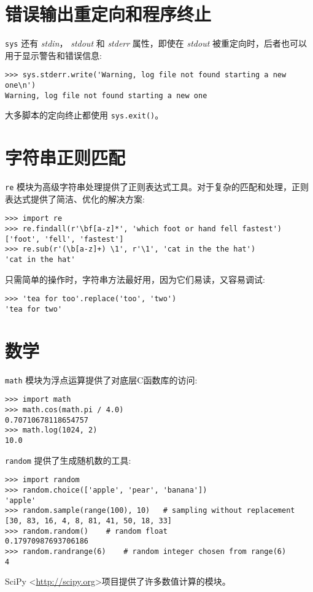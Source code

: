 \section{错误输出重定向和程序终止}
\texttt{sys} 还有 \textit{stdin}， \textit{stdout} 和 \textit{stderr} 属性，即使在 \textit{stdout} 被重定向时，后者也可以用于显示警告和错误信息:
\begin{lstlisting}
>>> sys.stderr.write('Warning, log file not found starting a new one\n')
Warning, log file not found starting a new one
\end{lstlisting}
大多脚本的定向终止都使用 \texttt{sys.exit()}。
\section{字符串正则匹配}
\texttt{re} 模块为高级字符串处理提供了正则表达式工具。对于复杂的匹配和处理，正则表达式提供了简洁、优化的解决方案:
\begin{lstlisting}
>>> import re
>>> re.findall(r'\bf[a-z]*', 'which foot or hand fell fastest')
['foot', 'fell', 'fastest']
>>> re.sub(r'(\b[a-z]+) \1', r'\1', 'cat in the the hat')
'cat in the hat'
\end{lstlisting}
只需简单的操作时，字符串方法最好用，因为它们易读，又容易调试:
\begin{lstlisting}
>>> 'tea for too'.replace('too', 'two')
'tea for two'
\end{lstlisting}
\section{数学}
\texttt{math} 模块为浮点运算提供了对底层C函数库的访问:
\begin{lstlisting}
>>> import math
>>> math.cos(math.pi / 4.0)
0.70710678118654757
>>> math.log(1024, 2)
10.0
\end{lstlisting}
\texttt{random} 提供了生成随机数的工具:
\begin{lstlisting}
>>> import random
>>> random.choice(['apple', 'pear', 'banana'])
'apple'
>>> random.sample(range(100), 10)   # sampling without replacement
[30, 83, 16, 4, 8, 81, 41, 50, 18, 33]
>>> random.random()    # random float
0.17970987693706186
>>> random.randrange(6)    # random integer chosen from range(6)
4
\end{lstlisting}
SciPy \textless \url{http://scipy.org}\textgreater 项目提供了许多数值计算的模块。
